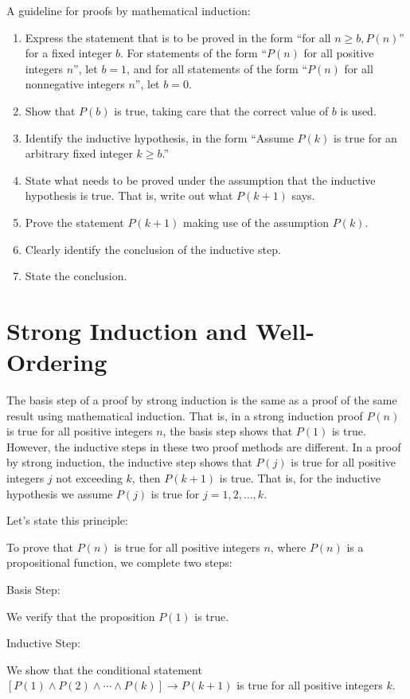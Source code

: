 \documentclass[../discrete.tex]{subfiles}
\begin{document}
A guideline for proofs by mathematical induction:
\begin{enumerate}
    \item Express the statement that is to be proved in the form ``for all $n\geq b, P(n)$'' for a fixed integer $b$. For statements of the form ``$P(n)$ for all positive integers $n$'', let $b=1$, and for all statements of the form ``$P(n)$ for all nonnegative integers $n$'', let $b=0$. 
    \item Show that $P(b)$ is true, taking care that the correct value of $b$ is used.
    \item Identify the inductive hypothesis, in the form ``Assume $P(k)$ is true for an arbitrary fixed integer $k\geq b$.''
    \item State what needs to be proved under the assumption that the inductive hypothesis is true. That is, write out what $P(k+1)$ says.
    \item Prove the statement $P(k+1)$ making use of the assumption $P(k)$.
    \item Clearly identify the conclusion of the inductive step.
    \item State the conclusion.
\end{enumerate}

\section{Strong Induction and Well-Ordering}
The basis step of a proof by strong induction is the same as a proof of the same result using 
mathematical induction. That is, in a strong induction proof $P(n)$ is true for all positive 
integers $n$, the basis step shows that $P(1)$ is true. However, the inductive steps in these two proof 
methods are different. In a proof by strong induction, the inductive step shows that $P(j)$ is true for 
all positive integers $j$ not exceeding $k$, then $P(k+1)$ is true. That is, for the inductive 
hypothesis we assume $P(j)$ is true for $j=1,2,\dots,k$.

Let's state this principle:

To prove that $P(n)$ is true for all positive integers $n$, where $P(n)$ is a propositional 
function, we complete two steps:

Basis Step:

We verify that the proposition $P(1)$ is true.

Inductive Step:

We show that the conditional statement $[P(1)\land P(2) \land \cdots \land P(k)]\rightarrow P(k+1)$ is true for all positive integers $k$.
\end{document}
